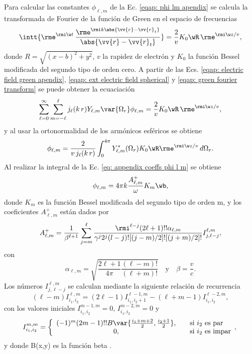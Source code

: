 Para calcular las constantes $\phi_{\ell, m}$ de la Ec. \eqref{eqap: phi lm apendix} se calcula la transformada de Fourier de la función de Green en el espacio de frecuencias \cite{maciel2019electromagnetic}
\begin{equation}
\intt{\rme^{\rmi \w t} \,\frac{\rme^{\rmi k \abs{\vv{r}-\vv{r}_t}}}{\abs{\vv{r}-\vv{r}_t}}} = \frac{2}{v} K_0\wR \, \rme^{\rmi \w z/v},
\label{eqap: green fourier transform}
\end{equation}
donde $R = \sqrt{(x-b)^2+y^2}$, $v$ la rapidez de electrón y $K_0$ la función Bessel modificada del segundo tipo de orden cero. A partir de las Ecs. \eqref{eqap: electric field green apendix}, \eqref{eqap: ext electric field spherical} y \eqref{eqap: green fourier transform} se puede obtener la ecuaciación
\begin{equation}
\sum_{\ell=0}^{\infty}\sum_{m=-\ell}^{\ell} j_{\ell}(k \, r) Y_{\ell,m}\var{\Omega_r} \phi_{\ell, m} = \frac{2}{v} K_0\wR \, \rme^{\rmi \w z/v},
\end{equation}
y al usar la ortonormalidad de los armónicos esféricos se obtiene
\begin{equation}
\phi_{\ell,m} = \frac{2}{v \,j_{\ell}(k\,r)} \int_{0}^{4\pi} Y_{\ell,m}^{*}(\Omega_r) K_0\wR \rme^{\rmi \w z /v} \, d\Omega_{r}.
\label{eq: appendix coeffs phi l m}
\end{equation}
Al realizar la integral de la Ec.  \eqref{eq: appendix coeffs phi l m} se obtiene \cite{de1999relativistic}
\begin{equation}
\phi_{\ell,m} = 4\pi k \frac{A_{\ell, m}^{+}}{\omega}K_m\wb,
\end{equation}
donde $K_m$ es la función Bessel modificada del segundo tipo de orden m, y los coeficientes $A_{\ell, m}^{+}$ están dados por
\begin{equation}
A_{\ell, m}^{+} = \frac{1}{\beta^{\ell +1}}\sum_{j=m}^{\ell}\frac{\rmi^{\ell - j} (2\ell + 1)!! \alpha_{\ell, m}}{\gamma^j 2^j (l-j)! [(j-m)/2]! [(j+m)/2]! } I_{j, \ell - j}^{\ell, m},
\end{equation}
con
\begin{equation}
\alpha_{\ell, m} = \sqrt{\frac{2\ell + 1}{4\pi}\frac{(\ell-m)!}{(\ell +m)!}} \quad \text{y} \quad \beta = \frac{v}{c}.
\end{equation}
Los números $I_{j, \ell - j}^{\ell, m}$ se calculan mediante la siguiente relación de recurrencia
\begin{equation}
(\ell - m) I_{i_1,i_2}^{\ell,m}=(2\ell-1)I_{i_1,i_2+1}^{\ell-1,m}-(\ell + m -1)I_{i_1,i_2}^{\ell-2,m},
\end{equation}
con los valores iniciales $I_{i_1,i_2}^{m-1,m}=0$, $I_{i_1,i_2}^{m-2,m}=0$ y
\begin{equation}
I_{i_1,i_2}^{m,m} = 
\left\{ 
  \begin{array}{ c l }
    (-1)^m (2m-1)!! B\var{\frac{i_1 + m +2}{2}, \frac{i_2+1}{2}}, & \quad \textrm{si } i_2 \textrm{ es par} \\
    0,                 & \quad \textrm{si } i_2 \textrm{ es impar}
  \end{array},
\right.
\end{equation}
y donde B(x,y) es la función beta \citep{Abramowitz}.